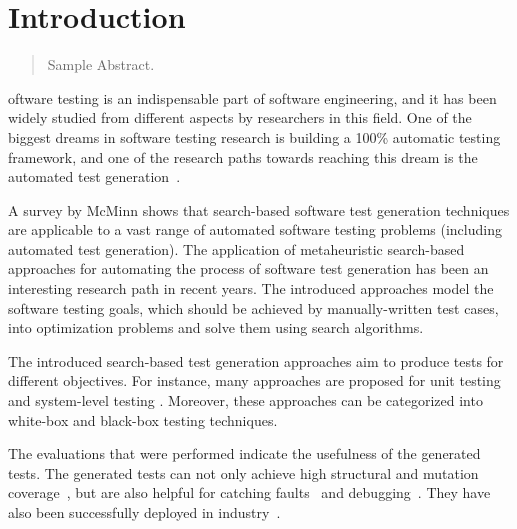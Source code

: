 \chapter{Introduction}
\label{introduction}

\begin{abstract}
Sample Abstract. 
\end{abstract}



\newpage
{}oftware testing is an indispensable part of software engineering, and it has been widely studied from different aspects by researchers in this field. One of the biggest dreams in software testing research is building a 100\% automatic testing framework, and one of the research paths towards reaching this dream is the automated test generation~\cite{bertolino2007software}.

A survey by McMinn \cite{McMinn2004} shows that search-based software test generation techniques are applicable to a vast range of automated software testing problems (including automated test generation). The application of metaheuristic search-based approaches for automating the process of software test generation has been an interesting research path in recent years. The introduced approaches model the software testing goals, which should be achieved by manually-written test cases, into optimization problems and solve them using search algorithms. 

The introduced search-based test generation approaches aim to produce tests for different objectives. For instance, many approaches are proposed for unit testing \cite{Fraser2011, braione2017tardis, braione2018sushi, prasetya2013t3} and system-level testing \cite{Arcuri2019, Holler2012, Padhye2019, beyene2012, coppit2005, godefroid2008}. Moreover, these approaches can be categorized into white-box \cite{Fraser2011, braione2017tardis, braione2018sushi, prasetya2013t3, Arcuri2019} and black-box \cite{Holler2012, Padhye2019, beyene2012, coppit2005, godefroid2008} testing techniques. 

The evaluations that were performed indicate the usefulness of the generated tests. The generated tests can not only achieve high structural and mutation coverage~\cite{Panichella2018a, Fraser2014b}, but are also helpful for catching faults~\cite{Shamshiri2016} and debugging~\cite{Ceccato2015}. They have also been successfully deployed in industry~\cite{Alshahwan2018, almasi2017industrial}.

